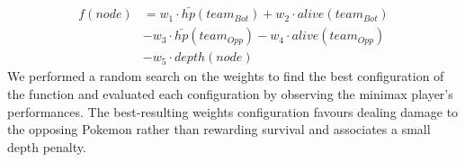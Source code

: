 \begin{equation}
\begin{split}
    f(node)&=w_1 \cdot \bar{hp}(team_{Bot}) +w_2 \cdot alive\left(team_{Bot}\right) \\ 
    & - w_3 \cdot \bar{hp}\left(team_{Opp}\right)
    - w_4 \cdot alive\left(team_{Opp}\right) \\
    &-w_5 \cdot depth(node)
\end{split}
\label{eq:complex_heuristic}
\end{equation}
We performed a random search on the weights to find the best configuration of the function and evaluated each configuration by observing the minimax player's performances. The best-resulting weights configuration favours dealing damage to the opposing Pokemon rather than rewarding survival and associates a small depth penalty.
